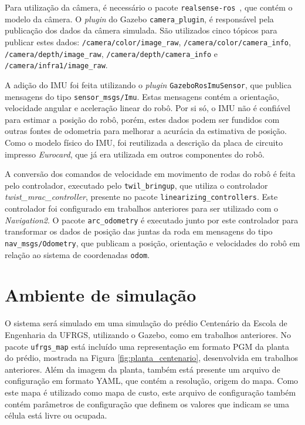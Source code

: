 \documentclass[repeatfields,xlists,xpacks,oneside,yearsonly]{ufrgscca}
\begin{document}
Para utilização da câmera, é necessário o pacote 
\texttt{realsense-ros}~\cite{realsense_ros}, que contém o modelo da câmera.
O \textit{plugin} do Gazebo \texttt{camera\_plugin}, 
é responsável pela publicação dos dados da câmera simulada.
São utilizados cinco tópicos para publicar estes dados:
\texttt{/camera/color/image\_raw}, \texttt{/camera/color/camera\_info},
\texttt{/camera/depth/image\_raw}, \texttt{/camera/depth/camera\_info} e
\texttt{/camera/infra1/image\_raw}.

A adição do IMU foi feita utilizando o \textit{plugin} 
\texttt{GazeboRosImuSensor}, que publica mensagens do tipo 
\texttt{sensor\_msgs/Imu}. 
Estas mensagens contém a orientação, velocidade angular e aceleração linear do robô.
Por si só, o IMU não é confiável para estimar a posição do robô, porém, estes 
dados podem ser fundidos com outras fontes de odometria para melhorar a 
acurácia da estimativa de posição.
Como o modelo físico do IMU, foi reutilizada 
a descrição da placa de circuito impresso \textit{Eurocard}, 
que já era utilizada em outros componentes do robô.

A conversão dos comandos de velocidade em movimento de rodas do 
robô é feita pelo controlador, executado pelo \texttt{twil\_bringup}, 
que utiliza o controlador \textit{twist\_mrac\_controller}, 
presente no pacote \texttt{linearizing\_controllers}.
Este controlador foi configurado em trabalhos anteriores para
ser utilizado com o \textit{Navigation2}.
O pacote \texttt{arc\_odometry} é executado junto por este 
controlador para transformar os dados de posição das juntas 
da roda em mensagens do tipo \texttt{nav\_msgs/Odometry}, 
que publicam a posição, orientação e velocidades do robô em relação 
ao sistema de coordenadas \texttt{odom}.

\section{Ambiente de simulação}

O sistema será simulado em uma simulação do prédio Centenário da Escola de Engenharia
da UFRGS, utilizando o Gazebo, como em trabalhos anteriores.
No pacote \texttt{ufrgs\_map} está incluído uma representação em formato PGM da
planta do prédio, mostrada na Figura \ref{fig:planta_centenario}, desenvolvida em
trabalhos anteriores.
Além da imagem da planta, também está presente um arquivo de configuração 
em formato YAML, que contém a resolução, origem do mapa.
Como este mapa é utilizado como mapa de custo, este arquivo de configuração
também contém parâmetros de configuração 
que definem os valores que indicam se uma célula está livre ou ocupada.
\end{document}
